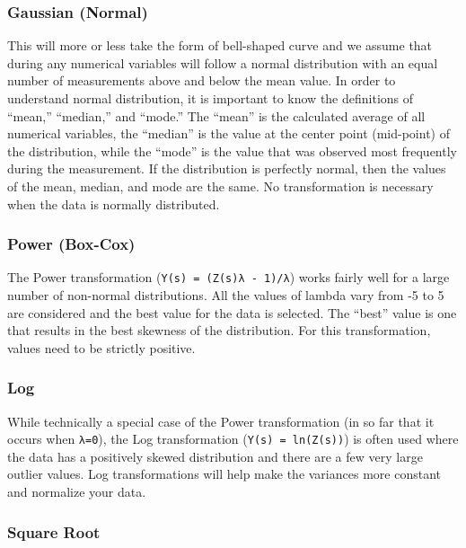 \documentclass[
  12pt,
]{krantz}
\begin{document}
\hypertarget{gaussian-normal}{%
\subsubsection*{Gaussian (Normal)}\label{gaussian-normal}}


This will more or less take the form of bell-shaped curve and we assume that during any numerical variables will follow a normal distribution with an equal number of measurements above and below the mean value. In order to understand normal distribution, it is important to know the definitions of ``mean,'' ``median,'' and ``mode.'' The ``mean'' is the calculated average of all numerical variables, the ``median'' is the value at the center point (mid-point) of the distribution, while the ``mode'' is the value that was observed most frequently during the measurement. If the distribution is perfectly normal, then the values of the mean, median, and mode are the same. No transformation is necessary when the data is normally distributed.

\hypertarget{power-box-cox}{%
\subsubsection*{Power (Box-Cox)}\label{power-box-cox}}


The Power transformation (\texttt{Y(s)\ =\ (Z(s)λ\ -\ 1)/λ}) works fairly well for a large number of non-normal distributions. All the values of lambda vary from -5 to 5 are considered and the best value for the data is selected. The ``best'' value is one that results in the best skewness of the distribution. For this transformation, values need to be strictly positive.

\hypertarget{log}{%
\subsubsection*{Log}\label{log}}


While technically a special case of the Power transformation (in so far that it occurs when \texttt{λ=0}), the Log transformation (\texttt{Y(s)\ =\ ln(Z(s))}) is often used where the data has a positively skewed distribution and there are a few very large outlier values. Log transformations will help make the variances more constant and normalize your data.

\hypertarget{square-root}{%
\subsubsection*{Square Root}\label{square-root}}
\end{document}
